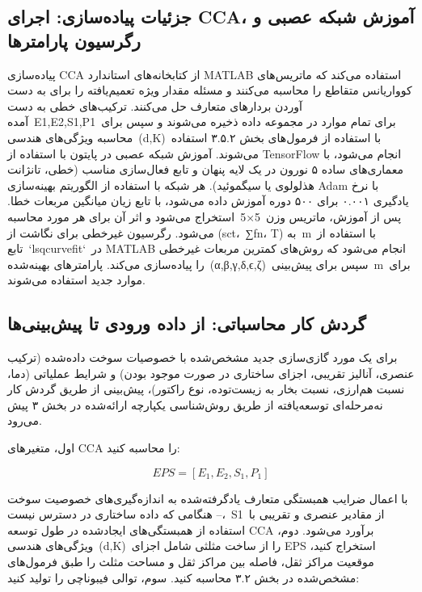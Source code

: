 \documentclass[12pt, a4paper]{article}
\begin{document}
\subsection{جزئیات پیاده‌سازی: اجرای CCA، آموزش شبکه عصبی و رگرسیون پارامترها}

پیاده‌سازی CCA از کتابخانه‌های استاندارد MATLAB استفاده می‌کند که ماتریس‌های کوواریانس متقاطع را محاسبه می‌کنند و مسئله مقدار ویژه تعمیم‌یافته را برای به دست آوردن بردارهای متعارف حل می‌کنند. ترکیب‌های خطی به دست آمده E1,E2,S1,P1 برای تمام موارد در مجموعه داده ذخیره می‌شوند و سپس برای محاسبه ویژگی‌های هندسی (d,K) با استفاده از فرمول‌های بخش ۳.۵.۲ استفاده می‌شوند. آموزش شبکه عصبی در پایتون با استفاده از TensorFlow انجام می‌شود، با معماری‌های ساده ۵ نورون در یک لایه پنهان و تابع فعال‌سازی مناسب (خطی، تانژانت هذلولوی یا سیگموئید). هر شبکه با استفاده از الگوریتم بهینه‌سازی Adam با نرخ یادگیری ۰.۰۰۱ برای ۵۰۰ دوره آموزش داده می‌شود، با تابع زیان میانگین مربعات خطا. پس از آموزش، ماتریس وزن 5×5 استخراج می‌شود و اثر آن برای هر مورد محاسبه می‌شود. رگرسیون غیرخطی برای نگاشت از (sct، ∑fn، T) به m با استفاده از تابع `lsqcurvefit` در MATLAB انجام می‌شود که روش‌های کمترین مربعات غیرخطی را پیاده‌سازی می‌کند. پارامترهای بهینه‌شده (α,β,γ,δ,ϵ,ζ) سپس برای پیش‌بینی m برای موارد جدید استفاده می‌شوند.

\subsection{گردش کار محاسباتی: از داده ورودی تا پیش‌بینی‌ها}

برای یک مورد گازی‌سازی جدید مشخص‌شده با خصوصیات سوخت داده‌شده (ترکیب عنصری، آنالیز تقریبی، اجزای ساختاری در صورت موجود بودن) و شرایط عملیاتی (دما، نسبت هم‌ارزی، نسبت بخار به زیست‌توده، نوع راکتور)، پیش‌بینی از طریق گردش کار نه‌مرحله‌ای توسعه‌یافته از طریق روش‌شناسی یکپارچه ارائه‌شده در بخش ۳ پیش می‌رود.

اول، متغیرهای CCA را محاسبه کنید:

\begin{equation}
EPS=[E_{1},E_{2},S_{1},P_{1}]
\end{equation}

با اعمال ضرایب همبستگی متعارف یادگرفته‌شده به اندازه‌گیری‌های خصوصیت سوخت – هنگامی که داده ساختاری در دسترس نیست، S1 از مقادیر عنصری و تقریبی با استفاده از همبستگی‌های ایجادشده در طول توسعه CCA برآورد می‌شود. دوم، ویژگی‌های هندسی (d,K) را از ساخت مثلثی شامل اجزای EPS استخراج کنید، موقعیت مراکز ثقل، فاصله بین مراکز ثقل و مساحت مثلث را طبق فرمول‌های مشخص‌شده در بخش ۳.۲ محاسبه کنید. سوم، توالی فیبوناچی را تولید کنید:
\end{document}
